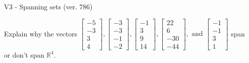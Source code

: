 \begin{exercise}
  \begin{exerciseTitle}V3 - Spanning sets (ver. 786)\end{exerciseTitle}
  \begin{exerciseStatement}
    Explain why the vectors \(\left[\begin{array}{r}
-5 \\
-3 \\
3 \\
4
\end{array}\right] , \left[\begin{array}{r}
-3 \\
-3 \\
-1 \\
-2
\end{array}\right] , \left[\begin{array}{r}
-1 \\
3 \\
9 \\
14
\end{array}\right] , \left[\begin{array}{r}
22 \\
6 \\
-30 \\
-44
\end{array}\right] , \text{ and } \left[\begin{array}{r}
-1 \\
-1 \\
3 \\
1
\end{array}\right]\) span or don't span \(\mathbb{R}^4\). 
	



\end{exerciseStatement}
\end{exercise}
